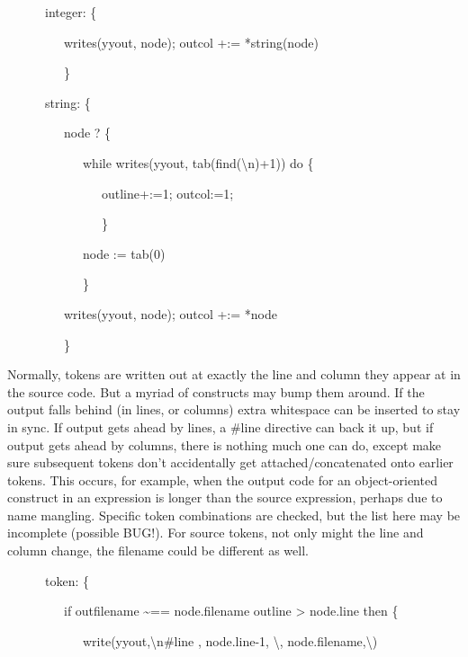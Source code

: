 {\ttfamily\mdseries
\ \ \ \ \ \ {\textquotedbl}integer{\textquotedbl}: \{}

{\ttfamily\mdseries
\ \ \ \ \ \ \ \ \ writes(yyout, node); outcol +:= *string(node)}

{\ttfamily\mdseries
\ \ \ \ \ \ \ \ \ \}}

{\ttfamily\mdseries
\ \ \ \ \ \ {\textquotedbl}string{\textquotedbl}: \{}

{\ttfamily\mdseries
\ \ \ \ \ \ \ \ \ node ? \{}

{\ttfamily\mdseries
\ \ \ \ \ \ \ \ \ \ \ \ while writes(yyout, tab(find({\textquotedbl}{\textbackslash}n{\textquotedbl})+1)) do \{}

{\ttfamily\mdseries
\ \ \ \ \ \ \ \ \ \ \ \ \ \ \ outline+:=1; outcol:=1;}

{\ttfamily\mdseries
\ \ \ \ \ \ \ \ \ \ \ \ \ \ \ \}}

{\ttfamily\mdseries
\ \ \ \ \ \ \ \ \ \ \ \ node := tab(0)}

{\ttfamily\mdseries
\ \ \ \ \ \ \ \ \ \ \ \ \}}

{\ttfamily\mdseries
\ \ \ \ \ \ \ \ \ writes(yyout, node); outcol +:= *node}

{\ttfamily\mdseries
\ \ \ \ \ \ \ \ \ \}}


{\textquotedbl}Normally{\textquotedbl}, tokens are written out at
exactly the line and column they appear at in the source code. But a
myriad of constructs may bump them around. If the output falls behind
(in lines, or columns) extra whitespace can be inserted to stay in
sync. If output gets ahead by lines, a \#line directive can back it
up, but if output gets ahead by columns, there is nothing much one can
do, except make sure subsequent tokens don't accidentally get
attached/concatenated onto earlier tokens. This occurs, for example,
when the output code for an object-oriented construct in an expression
is longer than the source expression, perhaps due to name
mangling. Specific token combinations are checked, but the list here
may be incomplete (possible BUG!). For source tokens, not only might
the line and column change, the filename could be different as well.

{\ttfamily\mdseries
\ \ \ \ \ \ {\textquotedbl}token{\textquotedbl}: \{}

{\ttfamily\mdseries
\ \ \ \ \ \ \ \ \ if outfilename \~{}== node.filename {\textbar} outline {\textgreater} node.line then \{}

{\ttfamily\mdseries
\ \ \ \ \ \ \ \ \ \ \ \ write(yyout,{\textquotedbl}{\textbackslash}n\#line {\textquotedbl}, node.line-1,{\textquotedbl}
{\textbackslash}{\textquotedbl}{\textquotedbl},
node.filename,{\textquotedbl}{\textbackslash}{\textquotedbl}{\textquotedbl})}


